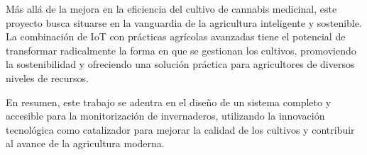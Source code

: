 Más allá de la mejora en la eficiencia del cultivo de cannabis medicinal, este proyecto busca situarse en la vanguardia de la agricultura inteligente y sostenible. La combinación de IoT con prácticas agrícolas avanzadas tiene el potencial de transformar radicalmente la forma en que se gestionan los cultivos, promoviendo la sostenibilidad y ofreciendo una solución práctica para agricultores de diversos niveles de recursos.

En resumen, este trabajo se adentra en el diseño de un sistema completo y accesible para la monitorización de invernaderos, utilizando la innovación tecnológica como catalizador para mejorar la calidad de los cultivos y contribuir al avance de la agricultura moderna.
